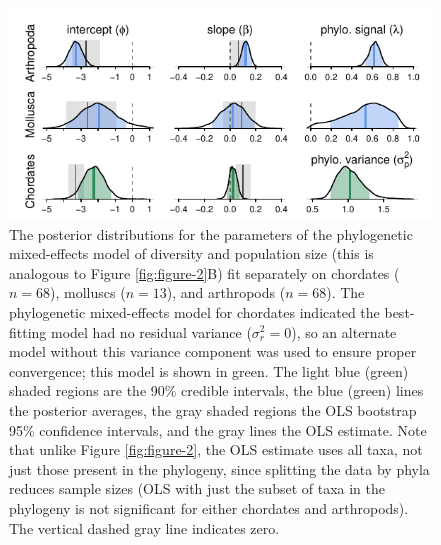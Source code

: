 \documentclass[11pt]{article}
\begin{document}
\begin{figure}[!htb]
  \centering
  \includegraphics[width=\textwidth]{figures/div_popsize_post_phyla.pdf}

  \caption{The posterior distributions for the parameters of the phylogenetic
    mixed-effects model of diversity and population size (this is analogous to
    Figure \ref{fig:figure-2}B) fit separately on chordates ($n=68$), molluscs
    ($n=13$), and arthropods ($n=68$). The phylogenetic mixed-effects model for
    chordates indicated the best-fitting model had no residual variance
    ($\sigma_r^2 = 0$), so an alternate model without this variance component
    was used to ensure proper convergence; this model is shown in green.
    The light blue (green) shaded regions are the 90\% credible intervals, the
    blue (green) lines the posterior averages, the gray shaded regions the OLS
    bootstrap 95\% confidence intervals, and the gray lines the OLS estimate.
    Note that unlike Figure \ref{fig:figure-2}, the OLS estimate uses all taxa,
    not just those present in the phylogeny, since splitting the data by phyla
    reduces sample sizes (OLS with just the subset of taxa in the phylogeny is
    not significant for either chordates and arthropods). The vertical dashed
  gray line indicates zero.}

  \label{suppfig:div_popsize_post_phyla}
\end{figure}
\end{document}
